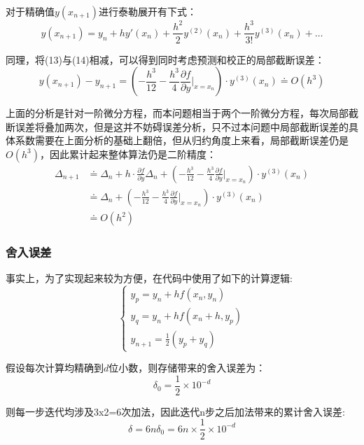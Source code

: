 \documentclass[UTF8]{ctexart}
\begin{document}
对于精确值$y(x_{n+1})$进行泰勒展开有下式：
\begin{equation}
    y(x_{n+1}) = y_n + hy'(x_n) + \frac{h^2}{2}y^{(2)}(x_n) + \frac{h^3}{3!}y^{(3)}(x_n) + \dots
\end{equation}

同理，将(13)与(14)相减，可以得到同时考虑预测和校正的局部截断误差：
\begin{equation}
    y(x_{n+1}) - y_{n+1} = (-\frac{h^3}{12} - \frac{h^3}{4}\frac{\partial f}{\partial y} \Bigg|_{x=x_n})\cdot y^{(3)}(x_n) \doteq O(h^3)
\end{equation}

上面的分析是针对一阶微分方程，而本问题相当于两个一阶微分方程，每次局部截断误差将叠加两次，但是这并不妨碍误差分析，只不过本问题中局部截断误差的具体系数需要在上面分析的基础上翻倍，但从归约角度上来看，局部截断误差仍是$O(h^3)$，因此累计起来整体算法仍是二阶精度：
\begin{equation}
    \begin{aligned}
    \Delta_{n+1} &\doteq \Delta_n + h\cdot \frac{\partial f}{\partial y}\Delta_n + (-\frac{h^3}{12} - \frac{h^3}{4}\frac{\partial f}{\partial y} \Bigg|_{x=x_n})\cdot y^{(3)}(x_n)\\
    &\doteq\Delta_n + (-\frac{h^3}{12} - \frac{h^3}{4}\frac{\partial f}{\partial y} \Bigg|_{x=x_n})\cdot y^{(3)}(x_n)\\
    &\doteq O(h^2)
    \end{aligned}
\end{equation}


\subsubsection{舍入误差}

事实上，为了实现起来较为方便，在代码中使用了如下的计算逻辑:
\begin{equation}
    \begin{cases}
        y_p = y_n + hf(x_n,y_n)\\
        y_q = y_n + hf(x_n+h,y_p)\\
        y_{n+1} = \frac{1}{2}(y_p+y_q)
    \end{cases}
\end{equation}

假设每次计算均精确到$d$位小数，则存储带来的舍入误差为：$$\delta_0 = \frac{1}{2}\times 10^{-d}$$

则每一步迭代均涉及3x2=6次加法，因此迭代n步之后加法带来的累计舍入误差:
\begin{equation}
    \delta = 6n\delta_0 = 6n\times \frac{1}{2}\times 10^{-d}    
\end{equation}
\end{document}
